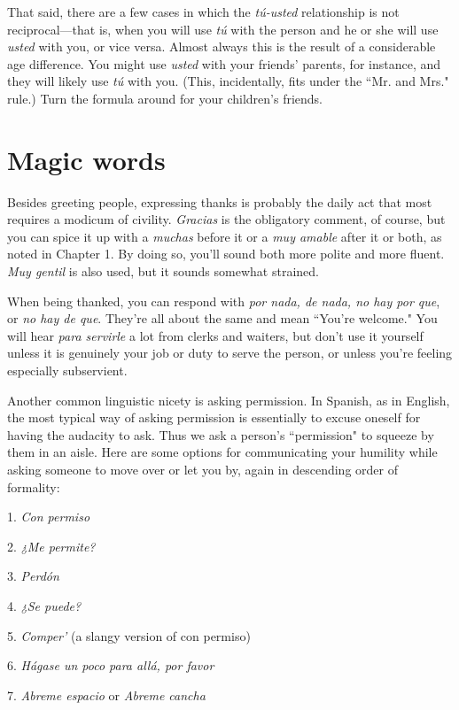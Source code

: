 That said, there are a few cases in which the \emph{tú-usted} relationship is not reciprocal---that is, when you will use \emph{tú} with the person
and he or she will use \emph{usted} with you, or vice versa. Almost always
this is the result of a considerable age difference. You might use \emph{usted}
with your friends' parents, for instance, and they will likely use \emph{tú}
with you. (This, incidentally, fits under the ``Mr. and Mrs." rule.) Turn
the formula around for your children's friends.

\section{Magic words}

Besides greeting people, expressing thanks is probably the
daily act that most requires a modicum of civility. \emph{Gracias} is the
obligatory comment, of course, but you can spice it up with a \emph{muchas}
before it or a \emph{muy amable} after it or both, as noted in Chapter 1. By
doing so, you'll sound both more polite and more fluent. \emph{Muy gentil} is
also used, but it sounds somewhat strained.

When being thanked, you can respond with \emph{por nada, de
nada, no hay por que}, or \emph{no hay de que}. They're all about the same
and mean ``You're welcome." You will hear \emph{para servirle} a lot from
clerks and waiters, but don't use it yourself unless it is genuinely
your job or duty to serve the person, or unless you're feeling especially subservient.

Another common linguistic nicety is asking permission. In
Spanish, as in English, the most typical way of asking permission is
essentially to excuse oneself for having the audacity to ask. Thus we
ask a person's ``permission" to squeeze by them in an aisle. Here are
some options for communicating your humility while asking someone
to move over or let you by, again in descending order of formality:

\bsk

1. \emph{Con permiso}

2. \emph{¿Me permite?}

3. \emph{Perdón}

4. \emph{¿Se puede?}

5. \emph{Comper'} (a slangy version of con permiso)

6. \emph{Hágase un poco para allá, por favor}

7. \emph{Abreme espacio} or \emph{Abreme cancha}

